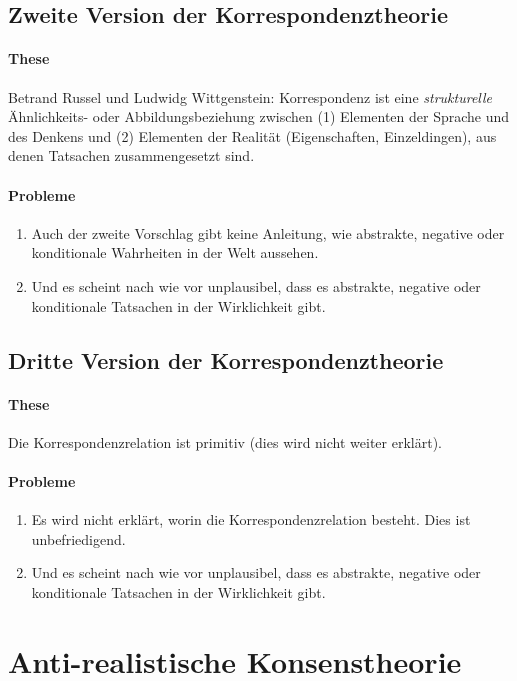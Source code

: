 \documentclass[../main.tex]{subfiles}
\begin{document}
\subsection{Zweite Version der Korrespondenztheorie}
\paragraph{These} Betrand Russel und Ludwidg Wittgenstein: Korrespondenz ist eine \textit{strukturelle} Ähnlichkeits- oder Abbildungsbeziehung zwischen (1) Elementen der Sprache und des Denkens und (2) Elementen der Realität (Eigenschaften, Einzeldingen), aus denen Tatsachen zusammengesetzt sind.
\paragraph{Probleme}
\begin{enumerate}
	\item Auch der zweite Vorschlag gibt keine Anleitung, wie abstrakte, negative oder konditionale Wahrheiten in der Welt aussehen.
	\item Und es scheint nach wie vor unplausibel, dass es abstrakte, negative oder konditionale Tatsachen in der Wirklichkeit gibt. 
\end{enumerate}

\subsection{Dritte Version der Korrespondenztheorie}
\paragraph{These} Die Korrespondenzrelation ist primitiv (dies wird nicht weiter erklärt).
\paragraph{Probleme} 
\begin{enumerate}
	\item Es wird nicht erklärt, worin die Korrespondenzrelation besteht. Dies ist unbefriedigend. 
	\item Und es scheint nach wie vor unplausibel, dass es abstrakte, negative oder konditionale Tatsachen in der Wirklichkeit gibt. 
\end{enumerate}

\section{Anti-realistische Konsenstheorie}
\end{document}
